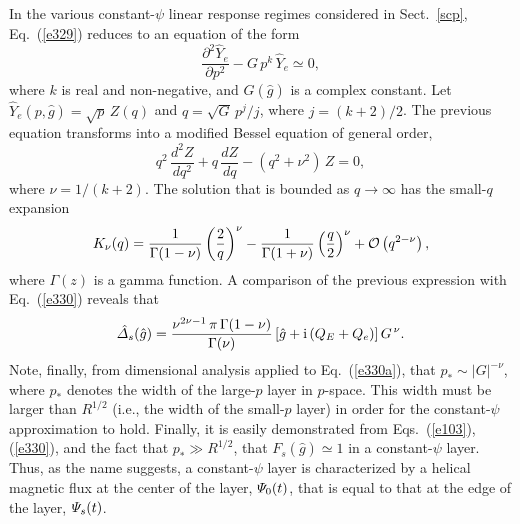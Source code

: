 \documentclass[12pt,prb,aps]{revtex4-1}
\begin{document}
In the various constant-$\psi$ linear response regimes considered in Sect.~\ref{scp}, Eq.~(\ref{e329}) reduces to an
equation of the form
\begin{equation}\label{e330a}
\frac{\partial^2\hat{Y}_e}{\partial p^2}- G\,p^k\,\hat{Y}_e\simeq 0,
\end{equation}
where $k$ is real and non-negative, and $G(\hat{g})$ is a complex constant. Let $\hat{Y}_e(p,\hat{g})=\!\sqrt{p}\,Z(q)$ and $q=\!\sqrt{G}\,p^j/j$, where
$j=(k+2)/2$. The previous equation transforms into a modified Bessel equation of general order, 
\begin{equation}
q^2\,\frac{d^2Z}{dq^2} + q\,\frac{dZ}{dq} - (q^2+\nu^2)\,Z =0,
\end{equation}
where $\nu=1/(k+2)$. The solution that is bounded as $q\rightarrow \infty$ has the small-$q$
expansion\,\cite{abram}
\begin{equation}\label{e332}
K_\nu(q)= \frac{1}{{\Gamma}(1-\nu)}\left(\frac{2}{q}\right)^\nu - \frac{1}{{\Gamma}(1+\nu)}\left(\frac{q}{2}\right)^\nu + {\cal O}\left(q^{2-\nu}\right),
\end{equation}
where $\Gamma(z)$ is a gamma function.
A comparison of the previous expression with Eq.~(\ref{e330}) reveals that
\begin{equation}
\hat{\mit\Delta}_s(\hat{g}) =  \frac{\nu^{2\nu-1}\,\pi\,\Gamma(1-\nu)}{\Gamma(\nu)}\left[\hat{g}+{\rm i}\,(Q_E+Q_e)\right]G^{\,\nu}.
\end{equation}
Note, finally, from dimensional analysis applied to Eq.~(\ref{e330a}), that $p_\ast\sim |G|^{-\nu}$, where $p_\ast$ denotes the width of the large-$p$ layer in $p$-space. This width must be larger than $R^{1/2}$ (i.e., the width of the small-$p$ layer) in order for the constant-$\psi$ approximation to hold.
Finally, it is easily demonstrated from Eqs.~(\ref{e103}), (\ref{e330}), and the fact that $p_\ast \gg R^{1/2}$, that
$F_s(\hat{g})\simeq 1$
in a constant-$\psi$ layer. Thus, as the name suggests, a constant-$\psi$ layer is characterized by a helical
magnetic flux at the center of the layer, ${\mit\Psi}_0(t)$, that is equal to that at the edge of the layer, ${\mit\Psi}_s(t)$. 
\end{document}
